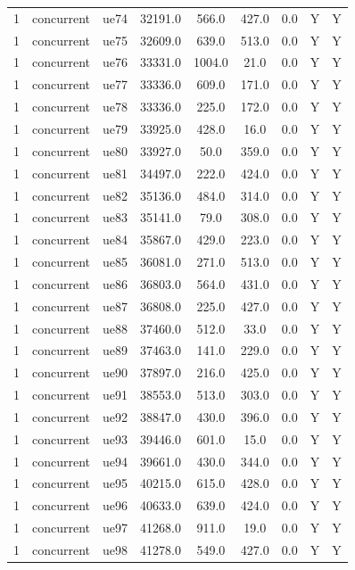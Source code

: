 \begin{table}[ht]
\begin{tabular}{|c|c|c|c|c|c|c|c|c|}
1 & concurrent & ue74 & 32191.0 & 566.0 & 427.0 & 0.0 & Y & Y \\
1 & concurrent & ue75 & 32609.0 & 639.0 & 513.0 & 0.0 & Y & Y \\
1 & concurrent & ue76 & 33331.0 & 1004.0 & 21.0 & 0.0 & Y & Y \\
1 & concurrent & ue77 & 33336.0 & 609.0 & 171.0 & 0.0 & Y & Y \\
1 & concurrent & ue78 & 33336.0 & 225.0 & 172.0 & 0.0 & Y & Y \\
1 & concurrent & ue79 & 33925.0 & 428.0 & 16.0 & 0.0 & Y & Y \\
1 & concurrent & ue80 & 33927.0 & 50.0 & 359.0 & 0.0 & Y & Y \\
1 & concurrent & ue81 & 34497.0 & 222.0 & 424.0 & 0.0 & Y & Y \\
1 & concurrent & ue82 & 35136.0 & 484.0 & 314.0 & 0.0 & Y & Y \\
1 & concurrent & ue83 & 35141.0 & 79.0 & 308.0 & 0.0 & Y & Y \\
1 & concurrent & ue84 & 35867.0 & 429.0 & 223.0 & 0.0 & Y & Y \\
1 & concurrent & ue85 & 36081.0 & 271.0 & 513.0 & 0.0 & Y & Y \\
1 & concurrent & ue86 & 36803.0 & 564.0 & 431.0 & 0.0 & Y & Y \\
1 & concurrent & ue87 & 36808.0 & 225.0 & 427.0 & 0.0 & Y & Y \\
1 & concurrent & ue88 & 37460.0 & 512.0 & 33.0 & 0.0 & Y & Y \\
1 & concurrent & ue89 & 37463.0 & 141.0 & 229.0 & 0.0 & Y & Y \\
1 & concurrent & ue90 & 37897.0 & 216.0 & 425.0 & 0.0 & Y & Y \\
1 & concurrent & ue91 & 38553.0 & 513.0 & 303.0 & 0.0 & Y & Y \\
1 & concurrent & ue92 & 38847.0 & 430.0 & 396.0 & 0.0 & Y & Y \\
1 & concurrent & ue93 & 39446.0 & 601.0 & 15.0 & 0.0 & Y & Y \\
1 & concurrent & ue94 & 39661.0 & 430.0 & 344.0 & 0.0 & Y & Y \\
1 & concurrent & ue95 & 40215.0 & 615.0 & 428.0 & 0.0 & Y & Y \\
1 & concurrent & ue96 & 40633.0 & 639.0 & 424.0 & 0.0 & Y & Y \\
1 & concurrent & ue97 & 41268.0 & 911.0 & 19.0 & 0.0 & Y & Y \\
1 & concurrent & ue98 & 41278.0 & 549.0 & 427.0 & 0.0 & Y & Y \\

\end{tabular}
\end{table}
